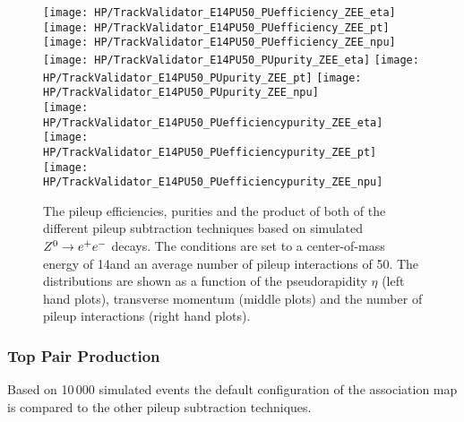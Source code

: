 \begin{figure}[!h]
  \centering
  \texttt{[image: HP/TrackValidator\_E14PU50\_PUefficiency\_ZEE\_eta]}
  \texttt{[image: HP/TrackValidator\_E14PU50\_PUefficiency\_ZEE\_pt]}
  \texttt{[image: HP/TrackValidator\_E14PU50\_PUefficiency\_ZEE\_npu]}
   \\
  \texttt{[image: HP/TrackValidator\_E14PU50\_PUpurity\_ZEE\_eta]}
  \texttt{[image: HP/TrackValidator\_E14PU50\_PUpurity\_ZEE\_pt]}
  \texttt{[image: HP/TrackValidator\_E14PU50\_PUpurity\_ZEE\_npu]}
   \\
  \texttt{[image: HP/TrackValidator\_E14PU50\_PUefficiencypurity\_ZEE\_eta]}
  \texttt{[image: HP/TrackValidator\_E14PU50\_PUefficiencypurity\_ZEE\_pt]}
  \texttt{[image: HP/TrackValidator\_E14PU50\_PUefficiencypurity\_ZEE\_npu]}
  \caption[Pileup efficiencies, purities and their product of the different pileup subtraction techniques based $\Zz\rightarrow\EE$ decays with 14\TeV and $\left<PU\right>=50$]{The pileup efficiencies, purities and the product of both of the different pileup subtraction techniques based on simulated$\Zz\rightarrow\EE$ decays. The conditions are set to a center-of-mass energy of 14\TeV and an average number of pileup interactions of 50. The distributions are shown as a function of the pseudorapidity $\eta$ (left hand plots), transverse momentum (middle plots) and the number of pileup interactions (right hand plots).}
\end{figure}
\clearpage

\subsubsection{Top Pair Production}

Based on 10\,000 simulated \ttbar events the default configuration of the association map is compared to the other pileup subtraction techniques.

